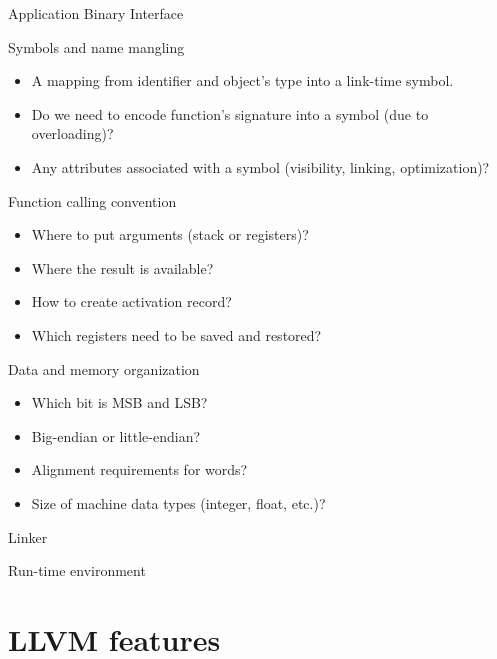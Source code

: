 \documentclass[8pt]{beamer}
\begin{document}
\begin{frame}{Application Binary Interface}
  \begin{block}{Symbols and name mangling}
    \begin{itemize}
      \item A mapping from identifier and object's type into a link-time symbol.
      \item Do we need to encode function's signature into a symbol (due to overloading)?
      \item Any attributes associated with a symbol (visibility, linking, optimization)?
    \end{itemize}
  \end{block}
    
  \begin{block}{Function calling convention}
    \begin{itemize}
      \item Where to put arguments (stack or registers)?
      \item Where the result is available?
      \item How to create activation record?
      \item Which registers need to be saved and restored?
    \end{itemize}
  \end{block}

  \begin{block}{Data and memory organization}
    \begin{itemize}
      \item Which bit is MSB and LSB?
      \item Big-endian or little-endian?
      \item Alignment requirements for words?
      \item Size of machine data types (integer, float, etc.)?
    \end{itemize}
  \end{block}
\end{frame}

\begin{frame}{Linker}
\end{frame}

\begin{frame}{Run-time environment}
\end{frame}

\section[Features]{LLVM features}
\end{document}
